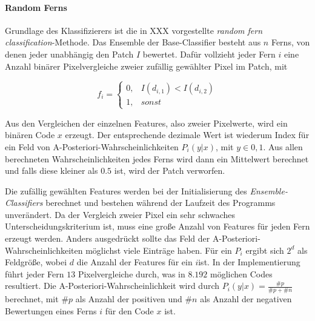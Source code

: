 	\paragraph{Random Ferns}
	Grundlage des Klassifizierers ist die in XXX vorgestellte \textit{random fern classification}-Methode. Das Ensemble der Base-Classifier besteht aus $n$ Ferns, von denen jeder unabhängig den Patch $I$ bewertet. Dafür vollzieht jeder Fern $i$ eine Anzahl binärer Pixelvergleiche zweier zufällig gewählter Pixel im Patch, mit

	\begin{equation}
	f_{i}=\begin{cases}
	0, & I(d_{i,1})<I(d_{i,2})\\
	1, & sonst
	\end{cases}
	\end{equation}

	Aus den Vergleichen der einzelnen Features, also zweier Pixelwerte, wird ein binären Code $x$ erzeugt. Der entsprechende dezimale Wert ist wiederum Index für ein Feld von A-Posteriori-Wahrscheinlichkeiten $P_{i}(y|x)$, mit $y\in{0,1}$. Aus allen berechneten Wahrscheinlichkeiten jedes Ferns wird dann ein Mittelwert berechnet und falls diese kleiner als $0.5$ ist, wird der Patch verworfen.

	Die zufällig gewählten Features werden bei der Initialisierung des \textit{Ensemble-Classifiers} berechnet und bestehen während der Laufzeit des Programms unverändert. Da der Vergleich zweier Pixel ein sehr schwaches Unterscheidungskriterium ist, muss eine große Anzahl von Features für jeden Fern erzeugt werden. Anders ausgedrückt sollte das Feld der A-Posteriori-Wahrscheinlichkeiten möglichst viele Einträge haben. Für ein $P_{i}$ ergibt sich $2^{d}$ als Feldgröße, wobei $d$ die Anzahl der Features für ein $i$ist. In der Implementierung führt jeder Fern $13$ Pixelvergleiche durch, was in $8.192$ möglichen Codes resultiert. Die A-Posteriori-Wahrscheinlichkeit wird durch $P_{i}(y|x)=\frac{\#p}{\#p+\#n}$ berechnet, mit $\#p$ als Anzahl der positiven und $\#n$ als Anzahl der negativen Bewertungen eines Ferns $i$ für den Code $x$ ist.

